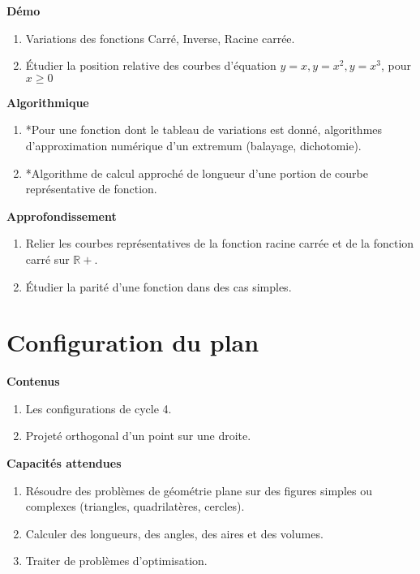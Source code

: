 \documentclass[10pt,a4paper]{article}
\begin{document}
\textbf{Démo}

\begin{enumerate}
\item Variations des fonctions Carré, Inverse, Racine carrée.
\item Étudier la position relative des courbes d'équation $y = x, y = x^2, y = x^3$, pour $x \geq 0$
\end{enumerate}
 
\textbf{Algorithmique}

\begin{enumerate}
\item *Pour une fonction dont le tableau de variations est donné, algorithmes d'approximation numérique d'un extremum (balayage, dichotomie).
\item *Algorithme de calcul approché de longueur d'une portion de courbe représentative de fonction.
\end{enumerate}

\textbf{Approfondissement}

\begin{enumerate}
\item Relier les courbes représentatives de la fonction racine carrée et de la fonction carré sur $\mathbb R+$.
\item Étudier la parité d'une fonction dans des cas simples.
\end{enumerate}




 
 
 

\section{Configuration du plan}

\textbf{Contenus}

\begin{enumerate}
\item Les configurations de cycle 4.
\item Projeté orthogonal d’un point sur une droite.
\end{enumerate}

\textbf{Capacités attendues}
 
\begin{enumerate}
\item Résoudre des problèmes de géométrie plane sur des figures simples ou complexes 
(triangles, quadrilatères, cercles).
\item  Calculer des longueurs, des angles, des aires et des volumes.
\item  Traiter de problèmes d’optimisation.
\end{enumerate}
\end{document}
